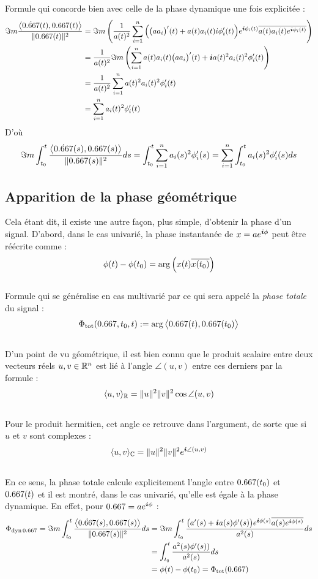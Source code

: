 Formule qui concorde bien avec celle de la phase dynamique une fois explicitée :
\begin{align*}
	\Im m\frac{\big\langle \dot{\x}(t) , \x(t) \big\rangle}{\|\x(t)\|^2} &= \Im m\left( \frac{1}{a(t)^2} \sum_{i=1}^n \Big( \big(aa_i\big)'(t) +a(t)a_i(t)i\phi_i'(t)\Big)e^{\i \phi_i(t)}\congu{a(t)a_i(t)e^{\i \phi_i(t)}} \right) \\
	&=\frac{1}{a(t)^2}  \Im m\left( \sum_{i=1}^n a(t)a_i(t)\big(aa_i\big)'(t) +\i a(t)^2a_i(t)^2\phi_i'(t) \right) \\
	&= \frac{1}{a(t)^2} \sum_{i=1}^n a(t)^2a_i(t)^2 \phi_i'(t) \\
	&= \sum_{i=1}^n a_i(t)^2 \phi_i'(t)
\end{align*}
D'où
\[\Im m\int_{t_0}^t \frac{\big\langle \dot{\x}(s) , \x(s) \big\rangle}{\|\x(s)\|^2} ds = \int_{t_0}^t \sum_{i=1}^n a_i(s)^2 \phi_i'(s) = \sum_{i=1}^n \int_{t_0}^t a_i(s)^2 \phi_i'(s)ds\]
\skipl



\subsection{Apparition de la phase géométrique}\label{subsec:intro_phaseg}

Cela étant dit, il existe une autre façon, plus simple, d'obtenir la phase d'un signal. D'abord, dans le cas univarié, la phase instantanée de $x=ae^{\boldsymbol{i} \phi}$ peut être réécrite comme :
\[\phi(t)-\phi(t_0)  = \arg\left( x(t) \overline{x(t_0)} \right)\]
\\
Formule qui se généralise en cas multivarié par ce qui sera appelé la \emph{phase totale} du signal :
\begin{equation}\label{eq:phase_t}
	\phaset(\x, t_0, t) \defeq \arg\big\langle \x(t), \x(t_0)\big\rangle
\end{equation}
\\
D'un point de vu géométrique, il est bien connu que le produit scalaire entre deux vecteurs réels $u,v\in\mathbb{R}^n$ est lié à l'angle $\angle(u,v)$ entre ces derniers par la formule :
\[\langle u,v\rangle_{\mathbb{R}} = \|u\|^2 \|v\|^2 \cos \angle(u,v)\]
\\
Pour le produit hermitien, cet angle ce retrouve dans l'argument, de sorte que si $u$ et $v$ sont complexes :
\[\langle u,v\rangle_{\mathbb{C}} = \|u\|^2 \|v\|^2 e^{\boldsymbol{i}  \angle(u,v)}\]
\\
En ce sens, la phase totale calcule explicitement l'angle entre $\x(t_0)$ et $\x(t)$ et il est montré, dans le cas univarié, qu'elle est égale à la phase dynamique. En effet, pour $\x = ae^{\i \phi}$ :
\begin{align*}
	\phased[\x] = \Im m\int_{t_0}^t \frac{\big\langle \dot{\x}(s) , \x(s) \big\rangle}{\|\x(s)\|^2} ds &= \Im m \int_{t_0}^t \frac{\big(a'(s) + \i a(s)\phi'(s) \big) e^{\i \phi(s)} \congu{a(s) e^{\i \phi(s)}}}{a^2(s)} ds \\
	&= \int_{t_0}^t \frac{a^2(s)\phi'(s))}{a^2(s)} ds \\
	&= \phi(t) - \phi(t_0) = \phaset(\x)
\end{align*}
\skipl

